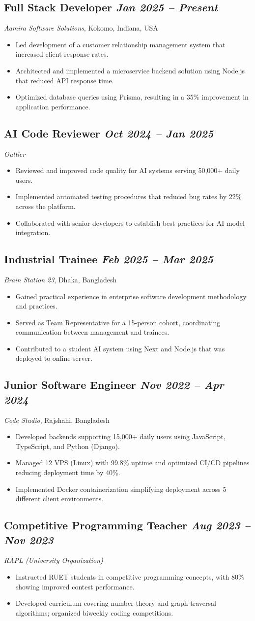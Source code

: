 \documentclass[10pt, a4paper]{article}
\newcommand{\datedsubsection}[2]{%
  \subsection*{#1 \hfill \small\textit{#2}}%
}
\newcommand{\resitem}[1]{\item #1} %
\begin{document}
\datedsubsection{Full Stack Developer}{Jan 2025 -- Present}
\textit{Aamira Software Solutions}, Kokomo, Indiana, USA
\begin{itemize}
    \resitem{Led development of a customer relationship management system that increased client response rates.}
    \resitem{Architected and implemented a microservice backend solution using Node.js that reduced API response time.}
    \resitem{Optimized database queries using Prisma, resulting in a 35\% improvement in application performance.}
\end{itemize}

\datedsubsection{AI Code Reviewer}{Oct 2024 -- Jan 2025}
\textit{Outlier}
\begin{itemize}
    \resitem{Reviewed and improved code quality for AI systems serving 50,000+ daily users.}
    \resitem{Implemented automated testing procedures that reduced bug rates by 22\% across the platform.}
    \resitem{Collaborated with senior developers to establish best practices for AI model integration.}
\end{itemize}

\datedsubsection{Industrial Trainee}{Feb 2025 -- Mar 2025}
\textit{Brain Station 23}, Dhaka, Bangladesh
\begin{itemize}
    \resitem{Gained practical experience in enterprise software development methodology and practices.}
    \resitem{Served as Team Representative for a 15-person cohort, coordinating communication between management and trainees.}
    \resitem{Contributed to a student AI system using Next and Node.js that was deployed to online server.}
\end{itemize}

\datedsubsection{Junior Software Engineer}{Nov 2022 -- Apr 2024}
\textit{Code Studio}, Rajshahi, Bangladesh
\begin{itemize}
    \resitem{Developed backends supporting 15,000+ daily users using JavaScript, TypeScript, and Python (Django).}
    \resitem{Managed 12 VPS (Linux) with 99.8\% uptime and optimized CI/CD pipelines reducing deployment time by 40\%.}
    \resitem{Implemented Docker containerization simplifying deployment across 5 different client environments.}
\end{itemize}

\datedsubsection{Competitive Programming Teacher}{Aug 2023 -- Nov 2023}
\textit{RAPL (University Organization)}
\begin{itemize}
    \resitem{Instructed RUET students in competitive programming concepts, with 80\% showing improved contest performance.}
    \resitem{Developed curriculum covering number theory and graph traversal algorithms; organized biweekly coding competitions.}
\end{itemize}
\end{document}
